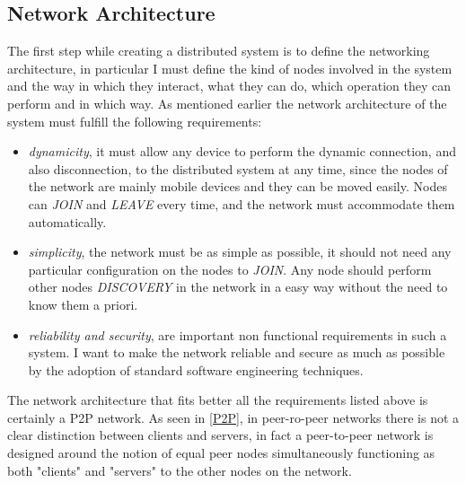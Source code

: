 \subsection{Network Architecture}
The first step while creating a distributed system is to define the networking architecture, in particular I must define the kind of nodes involved in the system and the way in which they interact, what they can do, which operation they can perform and in which way. As mentioned earlier the network architecture of the system must fulfill the following requirements:
\begin{itemize}
 \item \textit{dynamicity}, it must allow any device to perform the dynamic connection, and also disconnection, to the distributed system at any time, since the nodes of the network are mainly mobile devices and they can be moved easily. Nodes can \textit{JOIN} and \textit{LEAVE} every time, and the network must accommodate them automatically.
  \item \textit{simplicity}, the network must be as simple as possible, it should not need any particular configuration on the nodes to \textit{JOIN}. Any node should perform other nodes \textit{DISCOVERY} in the network in a easy way without the need to know them a priori.
 \item \textit{reliability and security}, are important non functional requirements in such a system. I want to make the network reliable and secure as much as possible by the adoption of standard software engineering techniques.
\end{itemize}
The network architecture that fits better all the requirements listed above is certainly a P2P network. As seen in \ref{P2P}, in peer-ro-peer networks there is not a clear distinction between clients and servers, in fact a peer-to-peer network is designed around the notion of equal peer nodes simultaneously functioning as both "clients" and "servers" to the other nodes on the network.

